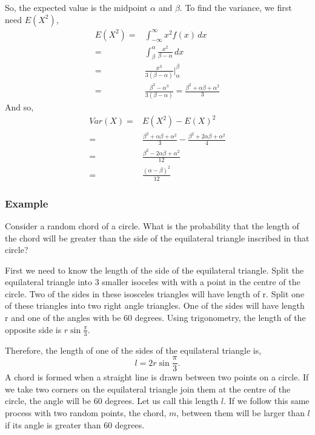 \documentclass{article}
\begin{document}
So, the expected value is the midpoint $\alpha$ and $\beta$. To find the variance, we first need $E(X^2)$,
\begin{align*}
    E(X^2) = & \int_{-\infty}^{\infty} x^2 f(x) \, dx \\
           = & \int_{\beta}^{\alpha} \frac{x^2}{\beta - \alpha} \, dx \\
           = & \frac{x^3}{3(\beta - \alpha)} \Bigr|^{\beta}_{\alpha} \\
           = & \frac{\beta^3 - \alpha^3}{3(\beta - \alpha)} = \frac{\beta^2 + \alpha \beta + \alpha^2}{3}
\end{align*}
And so,
\begin{align}
    Var(X) = & E(X^2) - E(X)^2 \\ 
           = & \frac{\beta^2 + \alpha \beta + \alpha^2}{3} - \frac{\beta^2 + 2\alpha \beta + \alpha^2}{4} \\
           = & \frac{\beta^2 - 2\alpha\beta + \alpha^2}{12} \\
           = & \frac{(\alpha - \beta)^2}{12}
\end{align}

\subsubsection{Example}

Consider a random chord of a circle. What is the probability that the length of the chord will be greater than the side of the equilateral triangle inscribed in that circle?

First we need to know the length of the side of the equilateral triangle. Split the equilateral triangle into 3 smaller isoceles with with a point in the centre of the circle. Two of the sides in these isosceles triangles will have length of r. Split one of these triangles into two right angle triangles. One of the sides will have length r and one of the angles with be 60 degrees. Using trigonometry, the length of the opposite side is $r \sin \frac{\pi}{3}$.

Therefore, the length of one of the sides of the equilateral triangle is,
$$
    l = 2 r \sin \frac{\pi}{3}.
$$
A chord is formed when a straight line is drawn between two points on a circle. If we take two corners on the equilateral triangle join them at the centre of the circle, the angle will be 60 degrees. Let us call this length $l$. If we follow this same process with two random points, the chord, $m$, between them will be larger than $l$ if its angle is greater than $60$ degrees.
\end{document}
